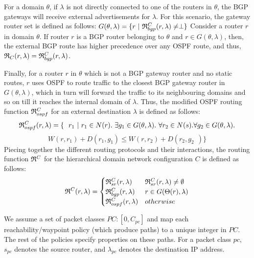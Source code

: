 For a domain $\theta$, if $\lambda$ is not directly 
connected to one of the routers in $\theta$, the BGP 
gateways will receive external advertisements for $\lambda$.
For this scenario, the gateway router set is defined as follows: 
$G(\theta, \lambda) = \{r ~|~ \mathfrak{R}^C_{bgp}(r, \lambda) \not= \perp\}$
Consider a router $r$ in domain $\theta$. 
If router $r$ is a BGP router belonging to $\theta$ and $r \in G (\theta, \lambda)$, then, the external BGP route has higher
precedence over any OSPF route, and thus, $\mathfrak{R}_C(r, \lambda)=\mathfrak{R}^C_{bgp}(r, \lambda)$. 

Finally, for a router $r$ in $\theta$ which is not a BGP gateway 
router and no static routes, $r$ uses OSPF to route traffic to the closest BGP
gateway router in $G (\theta, \lambda)$, which in turn will forward  the traffic to its neighbouring domains and so on till it reaches the internal domain of $\lambda$.  Thus, the modified OSPF routing 
function $\mathfrak{R}^C_{ospf}$ for an external destination $\lambda$
is defined as follows: 
\[
\mathfrak{R}_{ospf}^C(r,\lambda) = \{~~r_1 ~|~ r_1 \in N(r). ~\exists g_1 \in G (\theta, \lambda). ~\forall r_2 \in N(s). \forall g_2 \in G (\theta, \lambda). 
\]
\[ 
W(r, r_1) + D(r_1, g_1) \leq
W(r, r_2) + D(r_2, g_2~~)\}
\]
Piecing together the different routing protocols and their 
interactions, the routing function 
$\mathfrak{R}^C$ for the hierarchical domain network configuration $C$ is defined as follows: 
\[
\mathfrak{R}^C(r, \lambda) = 
\begin{cases}
\mathfrak{R}_{sr}^C(r, \lambda) & \mathfrak{R}_{sr}^C(r, \lambda) \not= \emptyset \\
\mathfrak{R}_{bgp}^C(r, \lambda) & r \in G(\Theta(r), \lambda) \\
\mathfrak{R}_{ospf}^C(r, \lambda) & otherwise 
\end{cases}
\]

We assume a set of packet classes $PC : [0,C_{pc}]$ 
and map each reachability/waypoint policy (which produce paths) 
to a unique integer in $PC$. The rest of the policies specify 
properties on these paths. 
For a packet class $pc$, $s_{pc}$ denotes the source router, 
and $\lambda_{pc}$
denotes the destination IP address. 

